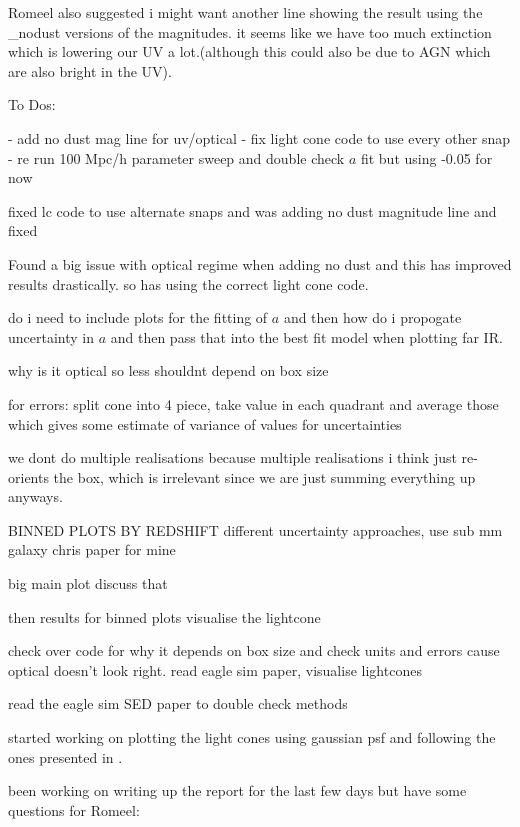 \documentclass[a4paper, 11pt, oneside]{researchjournal} %
\begin{document}
Romeel also suggested i might want another line showing the result using the \_nodust versions of the magnitudes. it seems like we have too much extinction which is lowering our UV a lot.(although this could also be due to AGN which are also bright in the UV).

To Dos:

- add no dust mag line for uv/optical
- fix light cone code to use every other snap
- re run 100 Mpc/h parameter sweep and double check $a$ fit but using -0.05 for now


fixed lc code to use alternate snaps and was adding no dust magnitude line and fixed 

Found a big issue with optical regime when adding no dust and this has improved results drastically. so has using the correct light cone code.

do i need to include plots for the fitting of $a$ and then how do i propogate uncertainty in $a$ and then pass that into the best fit model when plotting far IR.

why is it optical so less shouldnt depend on box size

for errors:
split cone into 4 piece, take value in each quadrant and average those which gives some estimate of variance of values for uncertainties

we dont do multiple realisations because multiple realisations i think just re-orients the box, which is irrelevant since we are just summing everything up anyways.

BINNED PLOTS BY REDSHIFT
different uncertainty approaches, use sub mm galaxy chris paper for mine

big main plot
discuss that 

then results for binned plots
visualise the lightcone


check over code for why it depends on box size and check units and errors cause optical doesn't look right. read eagle sim paper, visualise lightcones 

read the eagle sim SED paper to double check methods

 started working on plotting the light cones using gaussian psf and following the ones presented in \cite{lovellChristopherSimba_lightcone_generation2021}.

 been working on writing up the report for the last few days but have some questions for Romeel:
\end{document}
